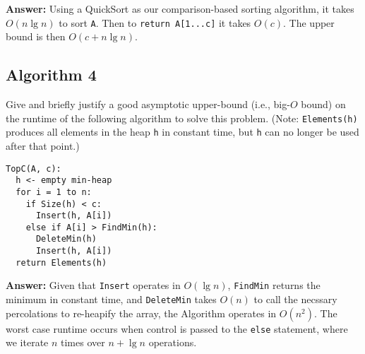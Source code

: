 \documentclass[11pt, oneside]{article}   	%
\theoremstyle{definition}
\theoremstyle{remark}
\begin{document}
\textbf{Answer: } Using a QuickSort as our comparison-based sorting algorithm, it takes $O(n \lg n)$ to sort \texttt{A}. Then to \texttt{return A[1...c]} it takes $O(c)$. The upper bound is then $O(c+n \lg n)$.  


\subsection{Algorithm 4}
Give and briefly justify a good asymptotic upper-bound (i.e., big-$O$
bound) on the runtime of the following algorithm to solve this
problem. (Note: \texttt{Elements(h)} produces all elements in the heap \texttt{h} in
constant time, but \texttt{h} can no longer be used after that point.)
\begin{verbatim}
TopC(A, c):
  h <- empty min-heap
  for i = 1 to n:
    if Size(h) < c:
      Insert(h, A[i])
    else if A[i] > FindMin(h):
      DeleteMin(h)
      Insert(h, A[i])
  return Elements(h)
\end{verbatim}

\textbf{Answer: }Given that \texttt{Insert} operates in $O(\lg n)$, \texttt{FindMin} returns the minimum in constant time, and \texttt{DeleteMin} takes $O(n)$ to call the necssary percolations to re-heapify the array, the Algorithm operates in $O(n^2)$. The worst case runtime occurs when control is passed to the \texttt{else} statement, where we iterate $n$ times over $n+\lg n$ operations. 
\end{document}
